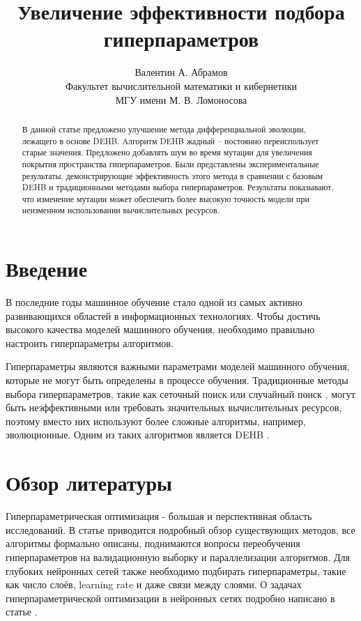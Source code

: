 \documentclass{article}
\title{Увеличение эффективности подбора гиперпараметров}
\author{ Валентин А. Абрамов \\
	Факультет вычислительной математики и кибернетики\\
	МГУ имени М. В. Ломоносова\\
}
\date{}
\begin{document}
\maketitle

\begin{abstract}
В данной статье предложено улучшение метода дифференциальной эволюции, лежащего в основе DEHB. Алгоритм DEHB жадный -- постоянно переиспользует старые значения. Предложено добавлять шум во время мутации для увеличения покрытия пространства гиперпараметров.
Были представлены экспериментальные результаты, демонстрирующие эффективность этого метода в сравнении с базовым DEHB и традиционными методами выбора гиперпараметров. Результаты показывают, что изменение мутации может обеспечить более высокую точность модели при неизменном использовании вычислительных ресурсов.

\end{abstract}


\section{Введение}

В последние годы машинное обучение стало одной из самых активно развивающихся областей в информационных технологиях. Чтобы достичь высокого качества моделей машинного обучения, необходимо правильно настроить гиперпараметры алгоритмов.

Гиперпараметры являются важными параметрами моделей машинного обучения, которые не могут быть определены в процессе обучения. Традиционные методы выбора гиперпараметров, такие как сеточный поиск \cite{grid_search} или случайный поиск \cite{random_search}, могут быть неэффективными или требовать значительных вычислительных ресурсов, поэтому вместо них используют более сложные алгоритмы, например, эволюционные. Одним из таких алгоритмов является DEHB \cite{awad2021dehb}.


\section{Обзор литературы}

Гиперпараметрическая оптимизация - большая и перспективная область исследований. В статье \cite{bischl2021hyperparameter} приводится подробный обзор существующих методов, все алгоритмы формально описаны, поднимаются вопросы переобучения гиперпараметров на валидационную выборку и параллелизации алгоритмов. Для глубоких нейронных сетей также необходимо подбирать гиперпараметры, такие как число слоёв, learning rate и даже связи между слоями. О задачах гиперпараметрической оптимизации в нейронных сетях подробно написано в статье \cite{Talbi2020OptimizationOD}.
\end{document}
